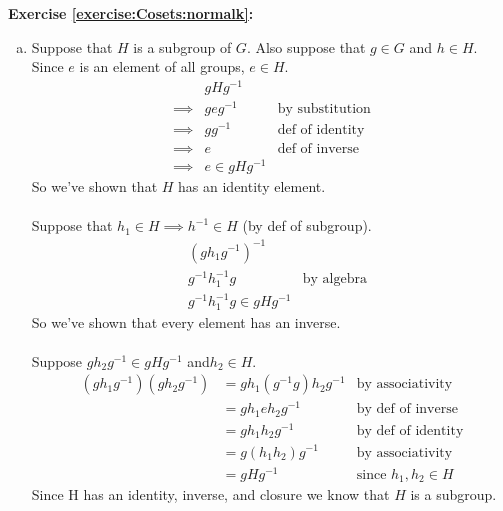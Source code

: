 \noindent\textbf{Exercise \ref{exercise:Cosets:normalk}:}
\begin{enumerate}[(a)]
\item
Suppose that $H$ is a subgroup of $G$.  Also suppose that $g \in G$ and $h \in H$.
\\
Since $e$ is an element of all groups, $e \in H$.
\begin{align*}
&gHg^{-1}
\\
\implies &geg^{-1} &\text{by substitution}
\\
\implies &gg^{-1} &\text{def of identity}
\\
\implies &e &\text{def of inverse}
\\
\implies &e \in gHg^{-1}
\end{align*}
So we've shown that $H$ has an identity element.
\\
\\
Suppose that $h_1 \in H \implies h^{-1} \in H$ (by def of subgroup).
\begin{align*}
&(gh_1g^{-1})^{-1}
\\
&g^{-1}h_1^{-1}g &\text{by algebra}
\\
&g^{-1}h_1^{-1}g \in gHg^{-1} 
\end{align*}
So we've shown that every element has an inverse.
\\
\\
Suppose $gh_2g^{-1} \in gHg^{-1}$ and$h_2 \in H$.
\begin{align*}
(gh_1g^{-1})(gh_2g^{-1}) &= gh_1(g^{-1}g)h_2g^{-1} &\text{by associativity}
\\
&= gh_1eh_2g^{-1} &\text{by def of inverse}
\\
&= gh_1h_2g^{-1} &\text{by def of identity}
\\
&= g(h_1h_2)g^{-1} &\text{by associativity}
\\
&= gHg^{-1} &\text{since\ } h_1, h_2 \in H
\end{align*}
Since H has an identity, inverse, and closure we know that $H$ is a subgroup.
 

\end{enumerate}
